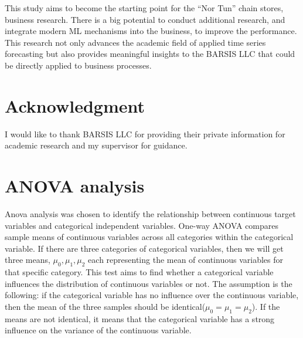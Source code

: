 \documentclass[conference]{IEEEtran}
\begin{document}
This study aims to become the starting point for the “Nor Tun” chain stores, business research. There is a big potential to conduct additional research, and integrate modern ML mechanisms into the business, to improve the performance. This research not only advances the academic field of applied time series forecasting but also provides meaningful insights to the BARSIS LLC that could be directly applied to business processes.

\section*{Acknowledgment}
I would like to thank BARSIS LLC for providing their private information for academic research and my supervisor for guidance.






\newpage %
\appendices

\section{ANOVA analysis}
\label{app:anova}
Anova analysis was chosen to identify the relationship between continuous target variables and categorical independent variables. One-way ANOVA compares sample means of continuous variables across all categories within the categorical variable. If there are three categories of categorical variables, then we will get three means, $\mu_0,\mu_1,\mu_2 $ each representing the mean of continuous variables for that specific category. This test aims to find whether a categorical variable influences the distribution of continuous variables or not. The assumption is the following: if the categorical variable has no influence over the continuous variable, then the mean of the three samples should be identical($\mu_0=\mu_1=\mu_2 $). If the means are not identical, it means that the categorical variable has a strong influence on the variance of the continuous variable.
\end{document}
